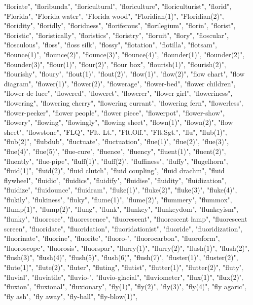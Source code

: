 "floriate",
"floribunda",
"floricultural",
"floriculture",
"floriculturist",
"florid",
"Florida",
"Florida water",
"Florida wood",
"Floridian(1)",
"Floridian(2)",
"floridity",
"floridly",
"floridness",
"floriferous",
"florilegium",
"florin",
"florist",
"floristic",
"floristically",
"floristics",
"floristry",
"floruit",
"flory",
"floscular",
"flosculous",
"floss",
"floss silk",
"flossy",
"flotation",
"flotilla",
"flotsam",
"flounce(1)",
"flounce(2)",
"flounce(3)",
"flounce(4)",
"flounder(1)",
"flounder(2)",
"flounder(3)",
"flour(1)",
"flour(2)",
"flour box",
"flourish(1)",
"flourish(2)",
"flourishy",
"floury",
"flout(1)",
"flout(2)",
"flow(1)",
"flow(2)",
"flow chart",
"flow diagram",
"flower(1)",
"flower(2)",
"flowerage",
"flower-bed",
"flower children",
"flower-de-luce",
"flowered",
"floweret",
"flowerer",
"flower-girl",
"floweriness",
"flowering",
"flowering cherry",
"flowering currant",
"flowering fern",
"flowerless",
"flower-pecker",
"flower people",
"flower piece",
"flowerpot",
"flower-show",
"flowery",
"flowing",
"flowingly",
"flowing sheet",
"flown(1)",
"flown(2)",
"flow sheet",
"flowstone",
"FLQ",
"Flt. Lt.",
"Flt.Off.",
"Flt.Sgt.",
"flu",
"flub(1)",
"flub(2)",
"flubdub",
"fluctuate",
"fluctuation",
"flue(1)",
"flue(2)",
"flue(3)",
"flue(4)",
"flue(5)",
"flue-cure",
"fluence",
"fluency",
"fluent(1)",
"fluent(2)",
"fluently",
"flue-pipe",
"fluff(1)",
"fluff(2)",
"fluffiness",
"fluffy",
"flugelhorn",
"fluid(1)",
"fluid(2)",
"fluid clutch",
"fluid coupling",
"fluid drachm",
"fluid flywheel",
"fluidic",
"fluidics",
"fluidify",
"fluidise",
"fluidity",
"fluidization",
"fluidize",
"fluidounce",
"fluidram",
"fluke(1)",
"fluke(2)",
"fluke(3)",
"fluke(4)",
"flukily",
"flukiness",
"fluky",
"flume(1)",
"flume(2)",
"flummery",
"flummox",
"flump(1)",
"flump(2)",
"flung",
"flunk",
"flunkey",
"flunkeydom",
"flunkeyism",
"flunky",
"fluoresce",
"fluorescence",
"fluorescent",
"fluorescent lamp",
"fluorescent screen",
"fluoridate",
"fluoridation",
"fluoridationist",
"fluoride",
"fluoridization",
"fluorinate",
"fluorine",
"fluorite",
"fluoro-",
"fluorocarbon",
"fluoroform",
"fluoroscope",
"fluorosis",
"fluorspar",
"flurry(1)",
"flurry(2)",
"flush(1)",
"flush(2)",
"flush(3)",
"flush(4)",
"flush(5)",
"flush(6)",
"flush(7)",
"fluster(1)",
"fluster(2)",
"flute(1)",
"flute(2)",
"fluter",
"fluting",
"flutist",
"flutter(1)",
"flutter(2)",
"fluty",
"fluvial",
"fluviatile",
"fluvio-",
"fluvio-glacial",
"fluviometer",
"flux(1)",
"flux(2)",
"fluxion",
"fluxional",
"fluxionary",
"fly(1)",
"fly(2)",
"fly(3)",
"fly(4)",
"fly agaric",
"fly ash",
"fly away",
"fly-ball",
"fly-blow(1)",
